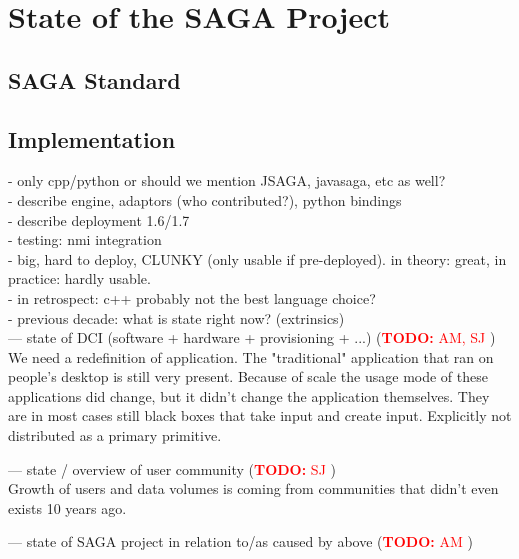 \documentclass{article}
\newcommand{\B}[1]{\textbf{#1}}
\newcommand{\nind}{\noindent}
\newcommand{\todo}[1]{{\textcolor{red}{\B{TODO:} #1 }}}
\begin{document}
\section{State of the SAGA Project}


\subsection{SAGA Standard}
\subsection{Implementation}
 - only cpp/python or should we mention JSAGA, javasaga, etc as well?\\
 - describe engine, adaptors (who contributed?), python bindings\\
 - describe deployment 1.6/1.7 \\
 - testing: nmi integration \\
 - big, hard to deploy, CLUNKY (only usable if pre-deployed). in theory: great, in practice: hardly usable. \\
 - in retrospect: c++ probably not the best language choice? \\
 


 \nind
 - previous decade: what is state right now? (extrinsics)\\
 --- state of DCI (software + hardware + provisioning + ...) (\todo{AM, SJ})\\
 
We need a redefinition of application. The "traditional" application that ran on people's desktop is still very present.
Because of scale the usage mode of these applications did change, but it didn't change the application themselves.
They are in most cases still black boxes that take input and create input.
Explicitly not distributed as a primary primitive.

 --- state / overview of user community (\todo{SJ})\\
 
 Growth of users and data volumes is coming from communities that didn't even exists 10 years ago.
 
 
 --- state of SAGA project in relation to/as caused by above (\todo{AM})
\end{document}
